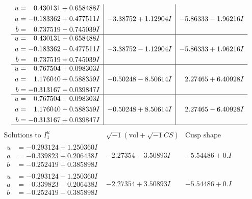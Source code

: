\documentclass[1p]{elsarticle_modified}
\theoremstyle{definition}
\newcommand{\I}{\sqrt{-1}}
\begin{document}
$$\begin{array}{c|c|c}
\begin{aligned}
u &= \phantom{-}0.430131 + 0.658488 I \\
a &= -0.183362 + 0.477511 I \\
b &= \phantom{-}0.737519 - 0.745039 I\end{aligned}
 & -3.38752 + 1.12904 I & -5.86333 - 1.96216 I \\ \hline\begin{aligned}
u &= \phantom{-}0.430131 - 0.658488 I \\
a &= -0.183362 - 0.477511 I \\
b &= \phantom{-}0.737519 + 0.745039 I\end{aligned}
 & -3.38752 - 1.12904 I & -5.86333 + 1.96216 I \\ \hline\begin{aligned}
u &= \phantom{-}0.767504 + 0.098303 I \\
a &= \phantom{-}1.176040 + 0.588359 I \\
b &= -0.313167 - 0.039847 I\end{aligned}
 & -0.50248 - 8.50614 I & \phantom{-}2.27465 + 6.40928 I \\ \hline\begin{aligned}
u &= \phantom{-}0.767504 - 0.098303 I \\
a &= \phantom{-}1.176040 - 0.588359 I \\
b &= -0.313167 + 0.039847 I\end{aligned}
 & -0.50248 + 8.50614 I & \phantom{-}2.27465 - 6.40928 I\\
 \hline 
 \end{array}$$\newpage$$\begin{array}{c|c|c}  
\text{Solutions to }I^u_{1}& \I (\text{vol} + \sqrt{-1}CS) & \text{Cusp shape}\\
 \hline 
\begin{aligned}
u &= -0.293124 + 1.250360 I \\
a &= -0.339823 + 0.206438 I \\
b &= -0.252419 + 0.385898 I\end{aligned}
 & -2.27354 - 3.50893 I & -5.54486 + 0. I\phantom{ +0.000000I} \\ \hline\begin{aligned}
u &= -0.293124 - 1.250360 I \\
a &= -0.339823 - 0.206438 I \\
b &= -0.252419 - 0.385898 I\end{aligned}
 & -2.27354 + 3.50893 I & -5.54486 + 0. I\phantom{ +0.000000I} \\ \hline\begin{aligned}

\end{aligned}
\end{array}$$
\end{document}
